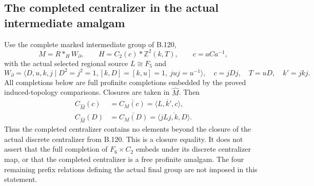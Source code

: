 \subsection*{The completed centralizer in the actual intermediate amalgam}

\label{stmt:B122}
Use the complete marked intermediate group of B.120,
\[
 M=R*_{H}W_{\partial},\qquad
 H=C_2(c)*\mathbb Z^2(k,T),\qquad c=aCa^{-1},
\]
with the actual selected regional source $L\cong F_5$ and
\[
 W_{\partial}=\langle D,u,k,j\mid D^2=j^2=1,
 [k,D]=[k,u]=1,\ juj=u^{-1}\rangle,
 \quad c=jDj,\quad T=uD,\quad k'=jkj.
\]
All completions below are full profinite completions embedded by
the proved induced-topology comparisons. Closures are taken in
$\widehat M$. Then
\begin{equation}\label{eq:B122-closure-centralizers}
 \begin{aligned}
 C_{\widehat M}(c)
   &=\overline{C_M(c)}
     =\overline{\langle L,k',c\rangle},\\
 C_{\widehat M}(D)
   &=\overline{C_M(D)}
     =\overline{\langle jLj,k,D\rangle}.
 \end{aligned}
\end{equation}
Thus the completed centralizer contains no elements beyond the
closure of the actual discrete centralizer from B.120. This is a
closure equality. It does not assert that the full completion of
$F_6\times C_2$ embeds under its discrete centralizer map, or that
the completed centralizer is a free profinite amalgam. The four
remaining prefix relations defining the actual final group are
not imposed in this statement.


